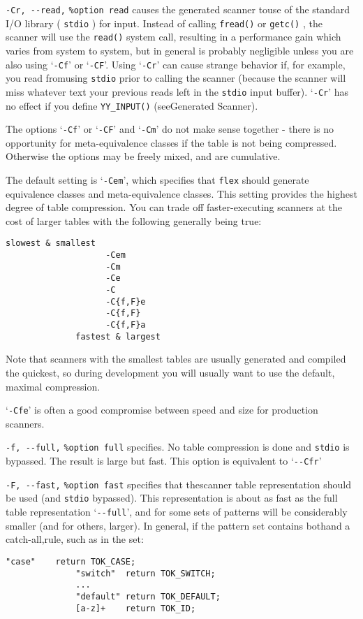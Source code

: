 \documentclass[openany,oneside]{book}
\begin{document}
\verb`-Cr, --read,` \verb`%option read` causes the generated scanner touse of the standard I/O
library ( \verb`stdio` ) for input.  Instead of calling \verb`fread()` or \verb`getc()` , the scanner will use the \verb`read()` system call,
resulting in a performance gain which varies from system to system, but
in general is probably negligible unless you are also using ‘\verb`-Cf`’
or ‘\verb`-CF`’.  Using ‘\verb`-Cr`’ can cause strange behavior if, for
example, you read fromusing \verb`stdio` prior to calling
the scanner (because the scanner will miss whatever text your previous
reads left in the \verb`stdio` input buffer).  ‘\verb`-Cr`’ has no effect
if you define \verb`YY_INPUT()` (seeGenerated Scanner).

The options ‘\verb`-Cf`’ or ‘\verb`-CF`’ and ‘\verb`-Cm`’ do not make sense
together - there is no opportunity for meta-equivalence classes if the
table is not being compressed.  Otherwise the options may be freely
mixed, and are cumulative.

The default setting is ‘\verb`-Cem`’, which specifies that \verb`flex` should generate equivalence classes and meta-equivalence classes.  This
setting provides the highest degree of table compression.  You can trade
off faster-executing scanners at the cost of larger tables with the
following generally being true:
\begin{verbatim}
slowest & smallest
                    -Cem
                    -Cm
                    -Ce
                    -C
                    -C{f,F}e
                    -C{f,F}
                    -C{f,F}a
              fastest & largest
\end{verbatim}


Note that scanners with the smallest tables are usually generated and
compiled the quickest, so during development you will usually want to
use the default, maximal compression.

‘\verb`-Cfe`’ is often a good compromise between speed and size for
production scanners.

\verb`-f, --full,` \verb`%option full` specifies. 
No table compression is done and \verb`stdio` is bypassed. 
The result is large but fast.  This option is equivalent to
‘\verb`--Cfr`’

\verb`-F, --fast,` \verb`%option fast` specifies that thescanner table representation should be
used (and \verb`stdio` bypassed).  This representation is about as fast
as the full table representation ‘\verb`--full`’, and for some sets of
patterns will be considerably smaller (and for others, larger).  In
general, if the pattern set contains bothand a
catch-all,rule, such as in the set:
\begin{verbatim}
"case"    return TOK_CASE;
              "switch"  return TOK_SWITCH;
              ...
              "default" return TOK_DEFAULT;
              [a-z]+    return TOK_ID;
\end{verbatim}
\end{document}

